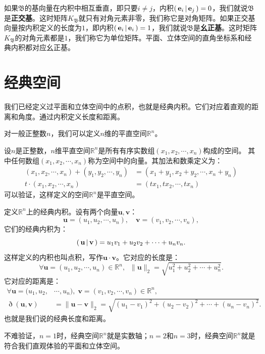 \documentclass[12pt,UTF8,fontset=none]{ctexbook}
\begin{document}
如果$\mathfrak{B}$的基向量在内积中相互垂直，即只要$i\neq j$，内积$\displaystyle\left( \,\mathbf{e}_i \,\middle\vert \,\mathbf{e}_j \,\right) = 0$，我们就说$\mathfrak{B}$是\textbf{正交基}。这时矩阵$K_{\mathfrak{B}}$就只有对角元素非零，我们称它是对角矩阵。如果正交基向量按内积定义的长度为$1$，即内积$\displaystyle\left( \,\mathbf{e}_i \,\middle\vert \,\mathbf{e}_i \,\right) = 1$，我们就说$\mathfrak{B}$是\textbf{幺正基}。这时矩阵$K_{\mathfrak{B}}$的对角元素都是$1$，我们称它为单位矩阵。平面、立体空间的直角坐标系和经典内积都对应幺正基。

\section{经典空间}

我们已经定义过平面和立体空间中的点积，也就是经典内积。它们对应着直观的距离和角度。通过内积定义长度和距离。

对一般正整数$n$，我们可以定义$n$维的平直空间$\mathbb{R}^n$。
\begin{df}
    设$n$是正整数，$n$维平直空间$\mathbb{R}^n$是所有有序实数组$(x_1, x_2, \cdots, x_n)$构成的空间。
    其中任何数组$(x_1, x_2, \cdots, x_n)$称为空间中的向量。其加法和数乘定义为：
    \begin{align*}
        (x_1, x_2, \cdots, x_n) + (y_1, y_2, \cdots, y_n) &= (x_1 + y_1, x_2 + y_2, \cdots, x_n + y_n) \\
        t\cdot (x_1, x_2, \cdots, x_n) &= (tx_1, tx_2, \cdots, t x_n)
    \end{align*}
    可以验证，这样定义的空间$\mathbb{R}^n$是平直空间。

    定义$\mathbb{R}^n$上的经典内积。设有两个向量$\mathbf{u}, \mathbf{v}$：
    $$ \mathbf{u} = (u_1, u_2, \cdots, u_n), \quad  \mathbf{v} = (v_1, v_2, \cdots, v_n), $$
    它们的经典内积为：
    $$ \displaystyle\left( \,\mathbf{u} \,\middle\vert \,\mathbf{v} \,\right) = u_1v_1 + u_2v_2 + \cdots + u_n v_n.$$
    这样定义的内积也叫点积，写作$\mathbf{u}\cdot \mathbf{v}$。它对应的长度是：
    $$ \forall \mathbf{u} = (u_1, u_2, \cdots, u_n) \in \mathbb{R}^n, \;\; \| \mathbf{u}\|_2 = \sqrt{u_1^2 + u_2^2 + \cdots + u_n^2} .$$
    它对应的距离是：
    \begin{align*}
        \forall \mathbf{u} = (u_1, u_2, &\cdots, u_n), \; \mathbf{v} = (v_1, v_2, \cdots, v_n) \in \mathbb{R}^n, \\
        \eth(\mathbf{u}, \mathbf{v}) &= \| \mathbf{u} - \mathbf{v}\|_2 = \sqrt{(u_1 - v_1)^2 + (u_2 - v_2)^2 + \cdots + (u_n - v_n)^2} .
    \end{align*}
    也就是我们说的经典长度和距离。
\end{df}
不难验证，$n=1$时，经典空间$\mathbb{R}^n$就是实数轴；$n=2$和$n=3$时，经典空间$\mathbb{R}^n$就是符合我们直观体验的平面和立体空间。
\end{document}

